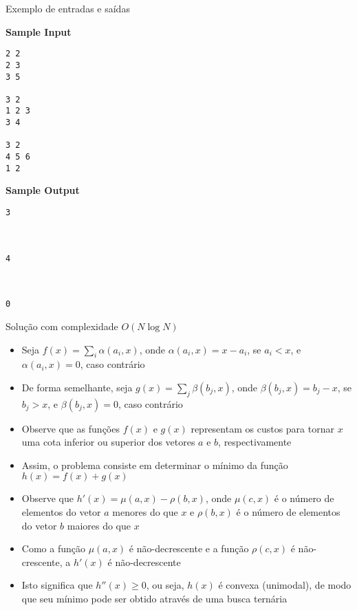 \begin{frame}[fragile]{Exemplo de entradas e saídas}

\begin{minipage}[t]{0.5\textwidth}
\textbf{Sample Input}
\begin{verbatim}
2 2
2 3
3 5

3 2
1 2 3
3 4

3 2
4 5 6
1 2
\end{verbatim}
\end{minipage}
\begin{minipage}[t]{0.45\textwidth}
\textbf{Sample Output}
\begin{verbatim}
3



4



0
\end{verbatim}
\end{minipage}
\end{frame}

\begin{frame}[fragile]{Solução com complexidade $O(N\log N)$}

    \begin{itemize}
        \item Seja $f(x) = \sum_i \alpha(a_i, x)$, onde $\alpha(a_i, x) = x - a_i$, se $a_i < x$,
            e $\alpha(a_i, x) = 0$, caso contrário

        \item De forma semelhante, seja $g(x) = \sum_j \beta(b_j, x)$, onde 
            $\beta(b_j, x) = b_j - x$, se $b_j > x$, e $\beta(b_j, x) = 0$, caso contrário

        \item Observe que as funções $f(x)$ e $g(x)$ representam os custos para tornar $x$ uma
            cota inferior ou superior dos vetores $a$ e $b$, respectivamente

        \item Assim, o problema consiste em determinar o mínimo da função $h(x) = f(x) + g(x)$

        \item Observe que $h'(x) = \mu(a, x) - \rho(b, x)$, onde $\mu(c, x)$ é o número de 
            elementos do vetor $a$ menores do que $x$ e $\rho(b, x)$ é o número de elementos do
            vetor $b$ maiores do que $x$

        \item Como a função $\mu(a, x)$ é não-decrescente e a função $\rho(c, x)$ é não-crescente, 
            a $h'(x)$ é não-decrescente

        \item Isto significa que $h''(x) \geq 0$, ou seja, $h(x)$ é convexa (unimodal),
            de modo que seu mínimo pode ser obtido através de uma busca ternária
   \end{itemize}

\end{frame}

